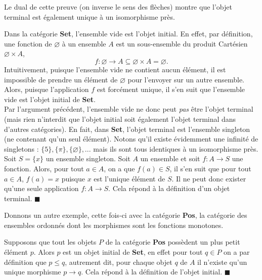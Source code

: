 \documentclass{article}
\begin{document}
Le dual de cette preuve (on inverse le sens des flèches) montre que l'objet terminal est également unique à un isomorphisme près.

\begin{example}[]{}
    Dans la catégorie \textbf{Set}, l'ensemble vide est l'objet initial. En effet, par définition, une fonction de $\varnothing$ à un ensemble $A$ est un sous-ensemble du produit Cartésien $\varnothing\times A$,
    $$
    f:\varnothing\to A\subseteq\varnothing\times A=\varnothing.
    $$
    Intuitivement, puisque l'ensemble vide ne contient aucun élément, il est impossible de prendre un élément de $\varnothing$ pour l'envoyer sur un autre ensemble. Alors, puisque l'application $f$ est forcément unique, il s'en suit que l'ensemble vide est l'objet initial de \textbf{Set}.\\

    \noindent
    Par l'argument précédent, l'ensemble vide ne donc peut \textit{pas} être l'objet terminal (mais rien n'interdit que l'objet initial soit également l'objet terminal dans d'autres catégories). En fait, dans \textbf{Set}, l'objet terminal est l'ensemble singleton (ne contenant qu'un seul élément). Notons qu'il existe évidemment une infinité de singletons : $\{5\}, \{\pi\}, \{\varnothing\}, ...$ mais ils sont tous identiques à un isomorphisme près.\\

    \noindent
    Soit $S=\{x\}$ un ensemble singleton. Soit $A$ un ensemble et soit $f:A\to S$ une fonction. Alors, pour tout $a\in A$, on a que $f(a)\in S$, il s'en suit que pour tout $a\in A$, $f(a)=x$ puisque $x$ est l'unique élément de $S$. Il ne peut donc exister qu'une seule application $f:A\to S$. Cela répond à la définition d'un objet terminal. $\blacksquare$
\end{example}

Donnons un autre exemple, cette fois-ci avec la catégorie \textbf{Pos}, la catégorie des ensembles ordonnés dont les morphismes sont les fonctions monotones.

\begin{example}[]{}
    Supposons que tout les objets $P$ de la catégorie \textbf{Pos} possèdent un plus petit élément $p$. Alors $p$ est un objet initial de \textbf{Set}, en effet pour tout $q\in P$ on a par définition que $p\leq q$, autrement dit, pour chaque objet $q$ de $A$ il n'existe qu'un unique morphisme $p\to q$. Cela répond à la définition de l'objet initial. $\blacksquare$
\end{example}
\end{document}
